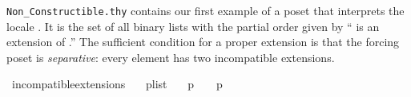 \texttt{Non\_Constructible.thy} contains our first example of a poset
that interprets the locale
. It is the set of all binary
lists with the partial order given by  `` is an extension of
.'' The sufficient condition for a proper extension is that
the forcing poset is \emph{separative}: every element has two
incompatible extensions.

\begin{isabelle}
\isamarkupfalse%
\ incompatible{\isacharunderscore}extensions{\isacharcolon}\isanewline
\ \ \ {\isachardoublequoteopen}p{\isasymin}list{\isacharparenleft}{}{\isacharparenright}{\isachardoublequoteclose}\isanewline
\ \ \ {\isachardoublequoteopen}{\isacharparenleft}p\ {\isacharat}\ {\isacharbrackleft}{}{\isacharbrackright}{\isacharparenright}\ {\isasymbottom}\ {\isacharparenleft}p\ {\isacharat}\ {\isacharbrackleft}{}{\isacharbrackright}{\isacharparenright}{\isachardoublequoteclose}
\end{isabelle}
 
